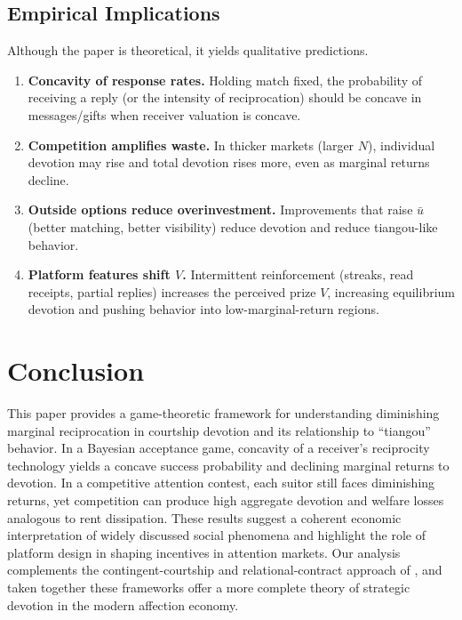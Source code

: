 \documentclass[AER]{AEA}
\begin{document}
\subsection{Empirical Implications}

Although the paper is theoretical, it yields qualitative predictions.
\begin{enumerate}
  \item \textbf{Concavity of response rates.} Holding match fixed, the probability of
    receiving a reply (or the intensity of reciprocation) should be concave in
    messages/gifts when receiver valuation is concave.
  \item \textbf{Competition amplifies waste.} In thicker markets (larger $N$), individual
    devotion may rise and total devotion rises more, even as marginal returns decline.
  \item \textbf{Outside options reduce overinvestment.} Improvements that raise $\bar{u}$
    (better matching, better visibility) reduce devotion and reduce tiangou-like behavior.
  \item \textbf{Platform features shift $V$.} Intermittent reinforcement (streaks, read
    receipts, partial replies) increases the perceived prize $V$, increasing equilibrium
    devotion and pushing behavior into low-marginal-return regions.
\end{enumerate}

\section{Conclusion}

This paper provides a game-theoretic framework for understanding diminishing marginal
reciprocation in courtship devotion and its relationship to ``tiangou'' behavior. In a
Bayesian acceptance game, concavity of a receiver's reciprocity technology yields a
concave success probability and declining marginal returns to devotion. In a competitive
attention contest, each suitor still faces diminishing returns, yet competition can
produce high aggregate devotion and welfare losses analogous to rent dissipation. These
results suggest a coherent economic interpretation of widely discussed social phenomena
and highlight the role of platform design in shaping incentives in attention markets. Our
analysis complements the contingent-courtship and relational-contract approach of
\citet{Price2026}, and taken together these frameworks offer a more complete theory of
strategic devotion in the modern affection economy.
\end{document}
